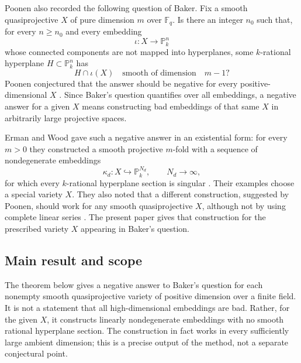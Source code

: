 \documentclass{lms}
\newcommand{\F}{\mathbb F}
\newcommand{\PP}{\mathbb P}
\begin{document}
Poonen also recorded the following question of Baker.  Fix a smooth quasiprojective $X$ of pure dimension $m$ over $\F_q$.  Is there an integer $n_0$ such that, for every $n\ge n_0$ and every embedding
\[
        \iota:X\longrightarrow \PP^n_k
\]
whose connected components are not mapped into hyperplanes, some $k$-rational hyperplane $H\subset\PP^n_k$ has
\[
        H\cap \iota(X)\quad\text{smooth of dimension}\quad m-1?
\]
Poonen conjectured that the answer should be negative for every positive-dimensional $X$ \cite[Question 4.1]{Poonen2004}.  Since Baker's question quantifies over all embeddings, a negative answer for a given $X$ means constructing bad embeddings of that same $X$ in arbitrarily large projective spaces.

Erman and Wood gave such a negative answer in an existential form: for every $m>0$ they constructed a smooth projective $m$-fold with a sequence of nondegenerate embeddings
\[
        \kappa_d:X\hookrightarrow \PP^{N_d}_k,
        \qquad N_d\to\infty,
\]
for which every $k$-rational hyperplane section is singular \cite[Proposition 9.3]{ErmanWood2015}.  Their examples choose a special variety $X$.  They also noted that a different construction, suggested by Poonen, should work for any smooth quasiprojective $X$, although not by using complete linear series \cite[Remark 9.4]{ErmanWood2015}.  The present paper gives that construction for the prescribed variety $X$ appearing in Baker's question.

\subsection{Main result and scope}

The theorem below gives a negative answer to Baker's question for each nonempty smooth quasiprojective variety of positive dimension over a finite field.  It is not a statement that all high-dimensional embeddings are bad.  Rather, for the given $X$, it constructs linearly nondegenerate embeddings with no smooth rational hyperplane section.  The construction in fact works in every sufficiently large ambient dimension; this is a precise output of the method, not a separate conjectural point.
\end{document}
